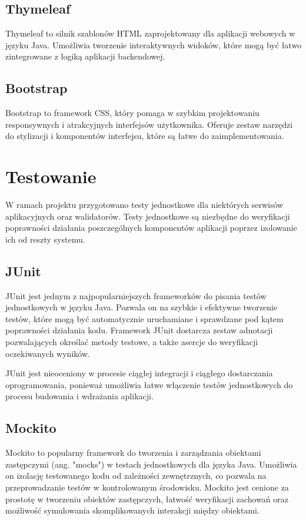 \documentclass[shortabstract]{iithesis}
\begin{document}
\subsection{Thymeleaf}
Thymeleaf to silnik szablonów HTML zaprojektowany dla aplikacji webowych w języku Java. Umożliwia tworzenie interaktywnych widoków, które mogą być łatwo zintegrowane z logiką aplikacji backendowej\cite{thymeleaf}.

\subsection{Bootstrap}
Bootstrap to framework CSS, który pomaga w szybkim projektowaniu responsywnych i atrakcyjnych interfejsów użytkownika. Oferuje zestaw narzędzi do stylizacji i komponentów interfejsu, które są łatwe do zaimplementowania\cite{bootstrap}.

\section{Testowanie}

W ramach projektu przygotowano testy jednostkowe dla niektórych serwisów aplikacyjnych oraz walidatorów. Testy jednostkowe są niezbędne do weryfikacji poprawności działania poszczególnych komponentów aplikacji poprzez izolowanie ich od reszty systemu.

\subsection{JUnit}

JUnit jest jednym z najpopularniejszych frameworków do pisania testów jednostkowych w języku Java. Pozwala on na szybkie i efektywne tworzenie testów, które mogą być automatycznie uruchamiane i sprawdzane pod kątem poprawności działania kodu. Framework JUnit dostarcza zestaw adnotacji pozwalających określać metody testowe, a także asercje do weryfikacji oczekiwanych wyników.


\newapge

JUnit jest nieoceniony w procesie ciągłej integracji i ciągłego dostarczania oprogramowania, ponieważ umożliwia łatwe włączenie testów jednostkowych do procesu budowania i wdrażania aplikacji\cite{junit}.

\subsection{Mockito}

Mockito to popularny framework do tworzenia i zarządzania obiektami zastępczymi (ang. "mocks") w testach jednostkowych dla języka Java. Umożliwia on izolację testowanego kodu od zależności zewnętrznych, co pozwala na przeprowadzanie testów w kontrolowanym środowisku. Mockito jest cenione za prostotę w tworzeniu obiektów zastępczych, łatwość weryfikacji zachowań oraz możliwość symulowania skomplikowanych interakcji między obiektami\cite{mockito}.
\end{document}
